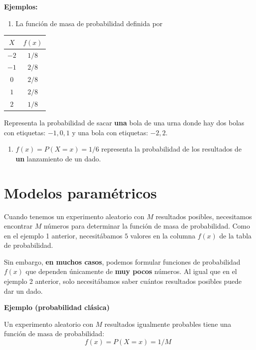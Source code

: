 \documentclass[
]{book}
\providecommand{\tightlist}{%
  \setlength{\itemsep}{0pt}\setlength{\parskip}{0pt}}
\begin{document}
\textbf{Ejemplos:}

\begin{enumerate}
\def\labelenumi{\arabic{enumi})}
\tightlist
\item
  La función de masa de probabilidad definida por
\end{enumerate}

\begin{longtable}[]{@{}cc@{}}
\toprule\noalign{}
\(X\) & \(f(x)\) \\
\midrule\noalign{}
\endhead
\bottomrule\noalign{}
\endlastfoot
\(-2\) & \(1/8\) \\
\(-1\) & \(2/8\) \\
\(0\) & \(2/8\) \\
\(1\) & \(2/8\) \\
\(2\) & \(1/8\) \\
\end{longtable}

Representa la probabilidad de sacar \textbf{una} bola de una urna donde hay dos bolas con etiquetas: \(-1, 0, 1\) y una bola con etiquetas: \(-2, 2\).

\begin{enumerate}
\def\labelenumi{\arabic{enumi})}
\setcounter{enumi}{1}
\tightlist
\item
  \(f(x)=P(X=x)=1/6\) representa la probabilidad de los resultados de \textbf{un} lanzamiento de un dado.
\end{enumerate}

\hypertarget{modelos-paramuxe9tricos}{%
\section{Modelos paramétricos}\label{modelos-paramuxe9tricos}}

Cuando tenemos un experimento aleatorio con \(M\) resultados posibles, necesitamos encontrar \(M\) números para determinar la función de masa de probabilidad. Como en el ejemplo 1 anterior, necesitábamos \(5\) valores en la columna \(f(x)\) de la tabla de probabilidad.

Sin embargo, \textbf{en muchos casos}, podemos formular funciones de probabilidad \(f(x)\) que dependen únicamente de \textbf{muy pocos} números. Al igual que en el ejemplo 2 anterior, solo necesitábamos saber cuántos resultados posibles puede dar un dado.

\textbf{Ejemplo (probabilidad clásica)}

Un experimento aleatorio con \(M\) resultados igualmente probables tiene una función de masa de probabilidad:
\[f(x)=P(X=x)=1/M\]
\end{document}
